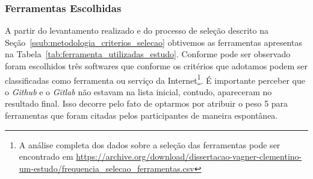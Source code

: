 
\subsubsection{Ferramentas Escolhidas}
\label{subsec:resultados_ferramentas_escolhidas}

A partir do levantamento realizado e do processo de seleção descrito na
Seção~\ref{ssub:metodologia_criterios_selecao} obtivemos as ferramentas
apresentas na Tabela~\ref{tab:ferramenta_utilizadas_estudo}. Conforme pode ser
observado foram escolhidos três softwares que conforme os critérios que
adotamos podem ser classificadas como ferramenta ou serviço da
Internet\footnote{A análise completa dos dados sobre a seleção das ferramentas
    pode ser encontrado em
    \url{https://archive.org/download/dissertacao-vagner-clementino-um-estudo/frequencia_selecao_ferramentas.csv}}.
É importante perceber que o \textit{Github} e o \textit{Gitlab} não estavam na
lista inicial, contudo, apareceram no resultado final. Isso decorre pelo fato
de optarmos por atribuir o peso 5 para ferramentas que foram citadas pelos
participantes de maneira espontânea.

\begin{table}[htpb]
\centering
{}
\caption{Ferramentas utilizados no estudo}
\label{tab:ferramenta_utilizadas_estudo}
\end{table}

